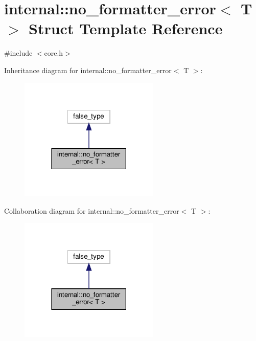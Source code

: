 \hypertarget{structinternal_1_1no__formatter__error}{}\section{internal\+:\+:no\+\_\+formatter\+\_\+error$<$ T $>$ Struct Template Reference}
\label{structinternal_1_1no__formatter__error}


{\ttfamily \#include $<$core.\+h$>$}



Inheritance diagram for internal\+:\+:no\+\_\+formatter\+\_\+error$<$ T $>$\+:
\nopagebreak
\begin{figure}[H]
\begin{center}
\leavevmode
\includegraphics[width=189pt]{structinternal_1_1no__formatter__error__inherit__graph}
\end{center}
\end{figure}


Collaboration diagram for internal\+:\+:no\+\_\+formatter\+\_\+error$<$ T $>$\+:
\nopagebreak
\begin{figure}[H]
\begin{center}
\leavevmode
\includegraphics[width=189pt]{structinternal_1_1no__formatter__error__coll__graph}
\end{center}
\end{figure}


